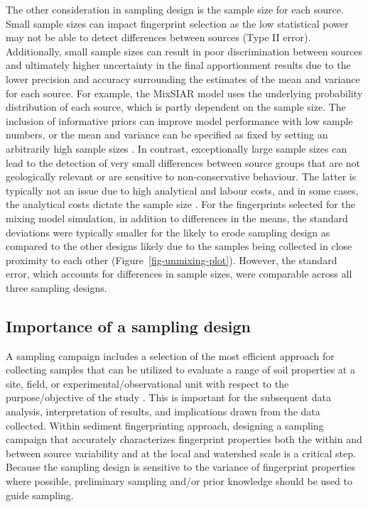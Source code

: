 \documentclass[
  number]{elsarticle}
\begin{document}
The other consideration in sampling design is the sample size for each
source. Small sample sizes can impact fingerprint selection as the low
statistical power may not be able to detect differences between sources
(Type II error). Additionally, small sample sizes can result in poor
discrimination between sources and ultimately higher uncertainty in the
final apportionment results due to the lower precision and accuracy
surrounding the estimates of the mean and variance for each source. For
example, the MixSIAR model uses the underlying probability distribution
of each source, which is partly dependent on the sample size. The
inclusion of informative priors can improve model performance with low
sample numbers, or the mean and variance can be specified as fixed by
setting an arbitrarily high sample sizes
\citep{ward2010, parnell2013, stock2018}. In contrast, exceptionally
large sample sizes can lead to the detection of very small differences
between source groups that are not geologically relevant or are
sensitive to non-conservative behaviour. The latter is typically not an
issue due to high analytical and labour costs, and in some cases, the
analytical costs dictate the sample size \citep[e.g.,][]{kieta2023}. For
the fingerprints selected for the mixing model simulation, in addition
to differences in the means, the standard deviations were typically
smaller for the likely to erode sampling design as compared to the other
designs likely due to the samples being collected in close proximity to
each other (Figure~\ref{fig-unmixing-plot}). However, the standard
error, which accounts for differences in sample sizes, were comparable
across all three sampling designs.

\subsection{Importance of a sampling
design}\label{importance-of-a-sampling-design}

A sampling campaign includes a selection of the most efficient approach
for collecting samples that can be utilized to evaluate a range of soil
properties at a site, field, or experimental/observational unit with
respect to the purpose/objective of the study \citep{pennock2008}. This
is important for the subsequent data analysis, interpretation of
results, and implications drawn from the data collected. Within sediment
fingerprinting approach, designing a sampling campaign that accurately
characterizes fingerprint properties both the within and between source
variability and at the local and watershed scale is a critical step.
Because the sampling design is sensitive to the variance of fingerprint
properties where possible, preliminary sampling and/or prior knowledge
should be used to guide sampling.
\end{document}

